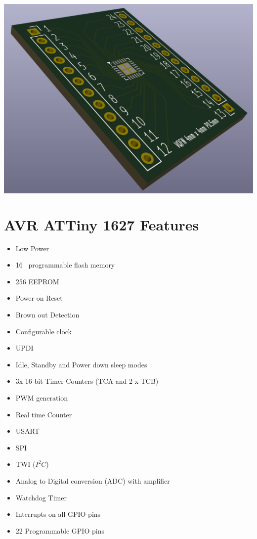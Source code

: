 \documentclass[11pt,a4paper,titlepage]{report}
\begin{document}
		\begin{center}
		\label{picture:breakout3}
		\includegraphics[scale=0.2]{assets/breakout_pcb_3d.png}
	\end{center}
	
	\chapter{AVR ATTiny 1627 Features}\label{appendix:attiny_features}
	\begin{itemize}
		\item Low Power
		\item 16\unit{\kilo\byte} programmable flash memory
		\item 256\unit{\byte} EEPROM
		\item Power on Reset
		\item Brown out Detection
		\item Configurable clock
		\item UPDI
		\item Idle, Standby and Power down sleep modes
		\item 3x 16 bit Timer Counters (TCA and 2 x TCB)
		\item PWM generation
		\item Real time Counter
		\item USART
		\item SPI
		\item TWI ($I^{2}C$)
		\item Analog to Digital conversion (ADC) with amplifier
		\item Watchdog Timer
		\item Interrupts on all GPIO pins
		\item 22 Programmable GPIO pins
	\end{itemize}
	
\end{document}
